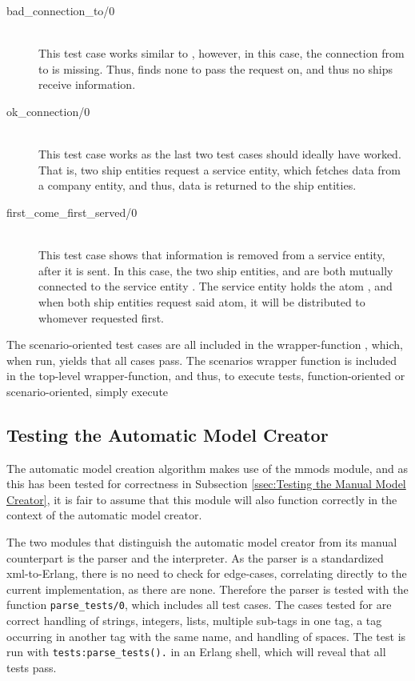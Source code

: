 \begin{description}
  \item[{bad\_connection\_to/0}]\ \\
    This test case works similar to , however, in this case, the connection from  to  is missing. Thus,  finds none to pass the request on, and thus no ships receive information.
  \item[{ok\_connection/0}]\ \\
    This test case works as the last two test cases should ideally have worked. That is, two ship entities request a service entity, which fetches data from a company entity, and thus, data is returned to the ship entities.
  \item[{first\_come\_first\_served/0}]\ \\
    This test case shows that information is removed from a service entity, after it is sent. In this case, the two ship entities,  and  are both mutually connected to the service entity . The service entity holds the atom , and when both ship entities request said atom, it will be distributed to whomever requested first. 
\end{description}

The scenario-oriented test cases are all included in the wrapper-function , which, when run, yields that all cases pass. The scenarios wrapper function is included in the top-level wrapper-function, and thus, to execute  tests, function-oriented or scenario-oriented, simply execute 

\subsection{Testing the Automatic Model Creator}

The automatic model creation algorithm makes use of the mmods module, and as this has been tested for correctness in Subsection \ref{ssec:Testing the Manual Model Creator}, it is fair to assume that this module will also function correctly in the context of the automatic model creator. 

The two modules that distinguish the automatic model creator from its manual counterpart is the parser and the interpreter. As the parser is a standardized xml-to-Erlang, there is no need to check for edge-cases, correlating directly to the current implementation, as there are none. Therefore the parser is tested with the function \lstinline{parse_tests/0}, which includes all test cases. The cases tested for are correct handling of strings, integers, lists, multiple sub-tags in one tag, a tag occurring in another tag with the same name, and handling of spaces. The test is run with \lstinline{tests:parse_tests().} in an Erlang shell, which will reveal that all tests pass.

